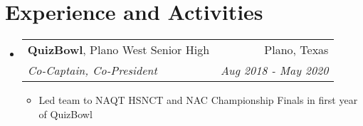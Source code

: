 \documentclass[letterpaper,11pt]{article}
\makeatletter
\newcommand{\resitem}[1]{\item #1 \vspace{-3pt}}
\newcommand{\ressubheading}[4]{
	\begin{tabular*}{7.0in}{l@{\extracolsep{\fill}}r}
			#1 & #2 \\
			\textit{#3} & \textit{#4}
	\end{tabular*}\vspace{-6pt}
}
\makeatother
\begin{document}
\section{Experience and Activities}

\begin{itemize}[leftmargin=*]
	\item
		\ressubheading{\textbf{QuizBowl}, Plano West Senior High}{Plano, Texas}{Co-Captain, Co-President}{Aug 2018 - May 2020}
			\begin{itemize}
				\resitem{Led team to NAQT HSNCT and NAC Championship Finals in first year of QuizBowl}
			\end{itemize}





\end{itemize}
\end{document}
